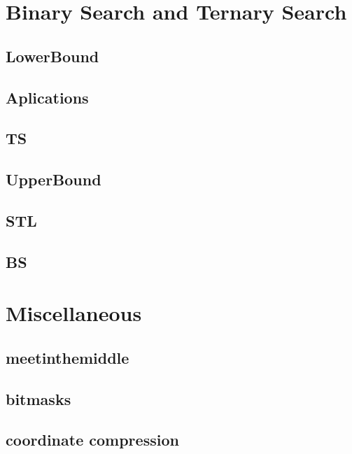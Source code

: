\section{Binary Search and Ternary Search}
\subsection{LowerBound}
\raggedbottom
\hrulefill
\subsection{Aplications}
\raggedbottom
\hrulefill
\subsection{TS}
\raggedbottom
\hrulefill
\subsection{UpperBound}
\raggedbottom
\hrulefill
\subsection{STL}
\raggedbottom
\hrulefill
\subsection{BS}
\raggedbottom
\hrulefill

\section{Miscellaneous}
\subsection{meetinthemiddle}
\raggedbottom
\hrulefill
\subsection{bitmasks}
\raggedbottom
\hrulefill
\subsection{coordinate compression}
\raggedbottom
\hrulefill
